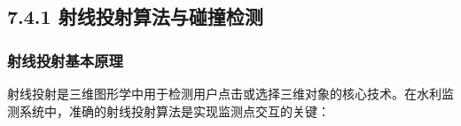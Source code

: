 \hypertarget{ux5c04ux7ebfux6295ux5c04ux7b97ux6cd5ux4e0eux78b0ux649eux68c0ux6d4b}{%
\subsection{7.4.1 射线投射算法与碰撞检测}\label{ux5c04ux7ebfux6295ux5c04ux7b97ux6cd5ux4e0eux78b0ux649eux68c0ux6d4b}}

\hypertarget{ux5c04ux7ebfux6295ux5c04ux57faux672cux539fux7406}{%
\subsubsection{射线投射基本原理}\label{ux5c04ux7ebfux6295ux5c04ux57faux672cux539fux7406}}


射线投射是三维图形学中用于检测用户点击或选择三维对象的核心技术。在水利监测系统中，准确的射线投射算法是实现监测点交互的关键：

